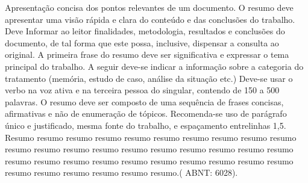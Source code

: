 Apresentação concisa dos pontos relevantes de um documento. O resumo deve apresentar uma visão rápida e clara do conteúdo e das conclusões do trabalho. Deve Informar ao leitor finalidades, metodologia, resultados e conclusões do documento, de tal forma que este possa, inclusive, dispensar a consulta ao original. A primeira frase do resumo deve ser significativa e expressar o tema principal do trabalho. A seguir deve-se indicar a informação sobre a categoria do tratamento (memória, estudo de caso, análise da situação etc.) Deve-se usar o verbo na voz ativa e na terceira pessoa do singular, contendo de 150 a 500 palavras. O resumo deve ser composto de uma sequência de frases concisas, afirmativas e não de enumeração de tópicos. Recomenda-se uso de parágrafo único e justificado, mesma fonte do trabalho, e espaçamento entrelinhas 1,5. Resumo resumo resumo resumo resumo resumo resumo resumo resumo resumo resumo resumo resumo resumo resumo resumo resumo resumo resumo resumo resumo resumo resumo resumo resumo resumo resumo resumo resumo resumo resumo resumo resumo resumo resumo resumo.( ABNT: 6028).

